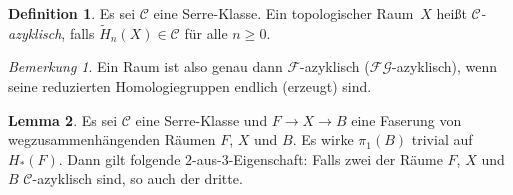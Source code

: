 \documentclass[11pt, a4paper, german]{article}
\theoremstyle{definition}
\newtheorem{lem}{Lemma}
\newtheorem{defn}[lem]{Definition}
\theoremstyle{remark}
\newtheorem*{bem}{Bemerkung}
\newcommand{\SC}{\mathcal{C}} %
\newcommand{\FG}{\mathcal{FG}} %
\newcommand{\F}{\mathcal{F}} %
\begin{document}
\begin{defn}
  Es sei $\SC$ eine Serre-Klasse.
  Ein topologischer Raum~$X$ heißt \emph{$\SC$-azyklisch}, falls $\widetilde{H}_n(X) \in \SC$ für alle $n \geq 0$.
\end{defn}

\begin{bem}
  Ein Raum ist also genau dann $\F$-azyklisch ($\FG$-azyklisch), wenn seine reduzierten Homologiegruppen endlich (erzeugt) sind.
\end{bem}

\begin{lem}\label{two-of-three}
  Es sei $\SC$ eine Serre-Klasse und $F \to X \to B$ eine Faserung von wegzusammenhängenden Räumen $F$, $X$ und $B$.
  Es wirke $\pi_1(B)$ trivial auf $H_*(F)$.
  Dann gilt folgende $2$-aus-$3$-Eigenschaft: Falls zwei der Räume $F$, $X$ und $B$ $\SC$-azyklisch sind, so auch der dritte.
\end{lem}
\end{document}

